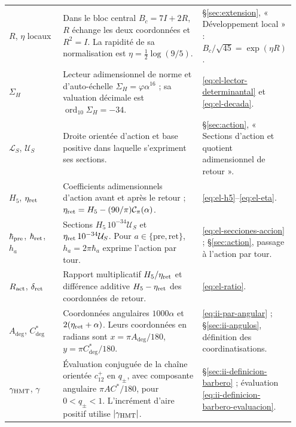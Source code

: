 \begin{longtable}{@{}>{\raggedright\arraybackslash}p{0.19\linewidth}
                    >{\raggedright\arraybackslash}p{0.49\linewidth}
                    >{\raggedright\arraybackslash}p{0.27\linewidth}@{}}
\(R\), \(\eta\) locaux
& Dans le bloc central \(B_c=7I+2R\), \(R\) échange les deux
  coordonnées et \(R^2=I\). La rapidité de sa normalisation est
  \(\eta=\tfrac12\log(9/5)\).
& \S\ref{sec:extension}, « Développement local » :
  \(B_c/\sqrt{45}=\exp(\eta R)\).\\[3pt]

\(\Sigma_H\)
& Lecteur adimensionnel de norme et d’auto-échelle
  \(\Sigma_H=\varphi\alpha^{16}\) ; sa valuation décimale est
  \(\operatorname{ord}_{10}\Sigma_H=-34\).
& \eqref{eq:el-lector-determinantal} et \eqref{eq:el-decada}.\\[3pt]

\pagebreak[4]

\(\mathcal L_S\), \(\mathcal U_S\)
& Droite orientée d'action et base positive dans laquelle s'expriment
  ses sections.
& \S\ref{sec:action}, « Sections d'action et quotient adimensionnel
  de retour ».\\[3pt]

\(H_5\), \(\eta_{\rm ret}\)
& Coefficients adimensionnels d'action avant et après le retour ;
  \(\eta_{\rm ret}=H_5-(90/\pi)\mathcal C_\pi(\alpha)\).
& \eqref{eq:el-h5}--\eqref{eq:el-eta}.\\[3pt]

\(\hbar_{\rm pre}\), \(\hbar_{\rm ret}\), \(h_a\)
& Sections \(H_5\,10^{-34}\mathcal U_S\) et
  \(\eta_{\rm ret}\,10^{-34}\mathcal U_S\).
  Pour \(a\in\{\mathrm{pre},\mathrm{ret}\}\),
  \(h_a=2\pi\hbar_a\) exprime l'action par tour.
& \eqref{eq:el-secciones-accion} ;
  \S\ref{sec:action}, passage à l'action par tour.\\[3pt]

\(R_{\rm act}\), \(\delta_{\rm ret}\)
& Rapport multiplicatif \(H_5/\eta_{\rm ret}\) et différence
  additive \(H_5-\eta_{\rm ret}\) des coordonnées de retour.
& \eqref{eq:el-ratio}.\\[3pt]

\(A_{\deg}\), \(C^*_{\deg}\)
& Coordonnées angulaires \(1000\alpha\) et
  \(2(\eta_{\rm ret}+\alpha)\). Leurs coordonnées en radians sont
  \(x=\pi A_{\deg}/180\), \(y=\pi C^*_{\deg}/180\).
& \eqref{eq:ii-par-angular} ;
  \S\ref{sec:ii-angulos}, définition des coordinatisations.\\[3pt]

\(\gamma_{\mathrm{HMT}}\), \(\gamma\)
& Évaluation conjuguée de la chaîne orientée \(c_{12}^{+}\) en
  \(q_\pm\), avec composante angulaire \(\pi AC^*/180\), pour
  \(0<q_\pm<1\). L'incrément d'aire positif utilise
  \(|\gamma_{\mathrm{HMT}}|\).
& \S\ref{sec:ii-definicion-barbero} ;
  évaluation \eqref{eq:ii-definicion-barbero-evaluacion}.\\[3pt]


\end{longtable}
